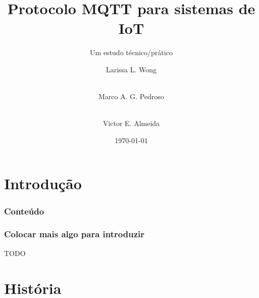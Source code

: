 \documentclass[12pt]{beamer}
\author[Grupo: MQTT]{Larissa L. Wong\and\\Marco A. G. Pedroso\and\\Victor E. Almeida}
\title{Protocolo MQTT para sistemas de IoT}
\subtitle{Um estudo técnico/prático}
\date{\today}
\institute{UNIOESTE}
\begin{document}
\frame{\titlepage}

\section{Introdução}\label{Introdução}

\begin{frame}
\frametitle{Conteúdo}
\tableofcontents
\end{frame}

\begin{frame}
    \frametitle{Colocar mais algo para introduzir}
    TODO
\end{frame}

\section{História}\label{História}
\end{document}
